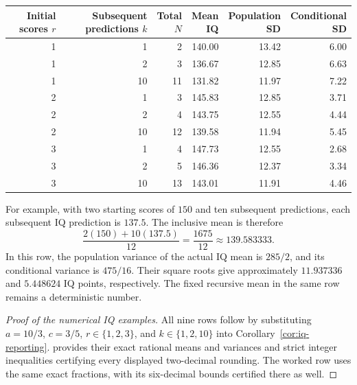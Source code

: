 \begin{center}
\begin{tabular}{rrr r r r}
\hline
\shortstack{Initial\\scores \(r\)} &
\shortstack{Subsequent\\predictions \(k\)} &
\shortstack{Total\\\(N\)} &
\shortstack{Mean\\IQ} &
\shortstack{Population\\SD} &
\shortstack{Conditional\\SD} \\
\hline
1 & 1  & 2  & 140.00 & 13.42 & 6.00 \\
1 & 2  & 3  & 136.67 & 12.85 & 6.63 \\
1 & 10 & 11 & 131.82 & 11.97 & 7.22 \\
\hline
2 & 1  & 3  & 145.83 & 12.85 & 3.71 \\
2 & 2  & 4  & 143.75 & 12.55 & 4.44 \\
2 & 10 & 12 & 139.58 & 11.94 & 5.45 \\
\hline
3 & 1  & 4  & 147.73 & 12.55 & 2.68 \\
3 & 2  & 5  & 146.36 & 12.37 & 3.34 \\
3 & 10 & 13 & 143.01 & 11.91 & 4.46 \\
\hline
\end{tabular}
\end{center}

For example, with two starting scores of \(150\) and ten subsequent
predictions, each subsequent IQ prediction is \(137.5\). The inclusive
mean is therefore
\[
  \frac{2(150)+10(137.5)}{12}
  =\frac{1675}{12}\approx139.583333.
\]
In this row, the population variance of the actual IQ mean is \(285/2\),
and its conditional variance is \(475/16\). Their square roots give
approximately \(11.937336\) and \(5.448624\) IQ points, respectively.
The fixed recursive mean in the same row remains a deterministic number.
\begin{proof}[Proof of the numerical IQ examples]
All nine rows follow by substituting \(a=10/3\), \(c=3/5\),
\(r\in\{1,2,3\}\), and \(k\in\{1,2,10\}\) into
Corollary~\ref{cor:iq-reporting}.  provides
their exact rational means and variances and strict integer inequalities
certifying every displayed two-decimal rounding. The worked row uses
the same exact fractions, with its six-decimal bounds certified there as well.
\end{proof}




